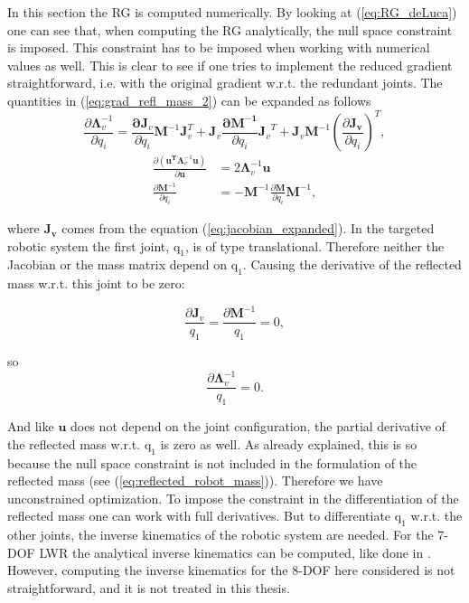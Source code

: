 In this section the RG is computed numerically. By looking at (\ref{eq:RG_deLuca}) one can see that, when computing the RG  analytically, the null space constraint is imposed. This constraint has to be  imposed when working with numerical values as well. This is clear to see if one  tries to  implement the reduced gradient straightforward, i.e. with the original gradient w.r.t. the redundant joints.  The quantities in (\ref{eq:grad_refl_mass_2}) can be expanded as follows
\begin{equation}
\frac{\partial {\mathbf{\Lambda}_{v}^{-1}}}{\partial {q_i}} = \frac{\mathbf{\partial {J}}_v}{\partial {q_i}}\mathbf{M}^{-1} \mathbf{J}_v^T + \mathbf{J}_v \frac{\mathbf{\partial {M^{-1}}}}{\partial {q_i}} {\mathbf{J}_v}^T + \mathbf{J}_v \mathbf{M}^{-1} \left ( \frac{\partial \mathbf{{J}_v}}{\partial {q_i}} \right )^T  ,
\end{equation}
\begin{align}
\frac{\partial {(\mathbf{u^T} \mathbf{\Lambda}_{v}^{-1} \mathbf{u})}}{\partial {\mathbf{u}}}& = 2 \mathbf{\Lambda}_{v}^{-1} \mathbf{u} \\
\frac{\partial {\mathrm{\mathbf{M}}^{-1}}}{\partial {q_i}} & = -\mathbf{M}^{-1} 
\frac{\partial {\mathrm{\mathbf{M}}}}{\partial {q_i}} \mathrm{\mathbf{M}}^{-1},
\end{align}


where $\mathrm{\mathbf{J_v}}$ comes from the equation (\ref{eq:jacobian_expanded}). In the targeted robotic system the first joint, $\mathrm{q_1}$, is of type translational. Therefore neither  the Jacobian or the mass matrix depend on $\mathrm{q_1}$. Causing the derivative of the reflected mass w.r.t. this joint to be zero:


\begin{equation}
\frac{\partial {{\mathbf{J}_v}}}{q_1} = \frac{\partial {{\mathbf{M}^{-1}}}}{q_1} = 0,
\label{eq:j_m_no__q1}
\end{equation}


so 
\begin{equation}
\frac{\partial {{\mathbf{\Lambda}_{v}^{-1}}}}{q_1} = 0.
\end{equation}

And like $\mathbf{u}$ does not depend on the joint configuration, the partial derivative of the reflected mass w.r.t. $\mathrm{q_1}$ is zero as well.
As already explained, this is so because the null space constraint is not included in the formulation of the reflected mass (see  (\ref{eq:reflected_robot_mass})). Therefore we have  unconstrained optimization.  
To impose the constraint in the differentiation of the reflected mass one can work with full derivatives. But to differentiate $\mathrm{q_1}$ w.r.t. the other joints, the inverse kinematics of the robotic system are needed. For the 7-DOF LWR the analytical inverse kinematics can be computed, like done in \cite{analyticalInverseKinematicComputation}. However, computing the inverse kinematics for the 8-DOF here considered is not straightforward, and it is not treated in this thesis.


